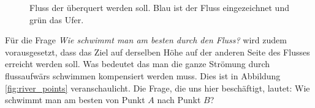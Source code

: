 \begin{refsection}
\begin{figure}
    \caption{Fluss der überquert werden soll. Blau ist der Fluss eingezeichnet und grün das Ufer.}
    \label{fig:river_original}
\end{figure}

Für die Frage \textit{Wie schwimmt man am besten durch den Fluss?} wird zudem vorausgesetzt, dass das Ziel auf derselben Höhe auf der anderen Seite des Flusses erreicht werden soll. Was bedeutet das man die ganze Strömung durch flussaufwärs schwimmen kompensiert werden muss. Dies ist in Abbildung \ref{fig:river_points} veranschaulicht. Die Frage, die uns hier beschäftigt, lautet: Wie schwimmt man am besten von Punkt \(A\) nach Punkt \(B\)?






\begin{figure}
    \centering
       

    
    \begin{tikzpicture}[x=0.75pt,y=0.75pt,yscale=-1,xscale=1]
    

\end{tikzpicture}
\end{figure}
\end{refsection}
